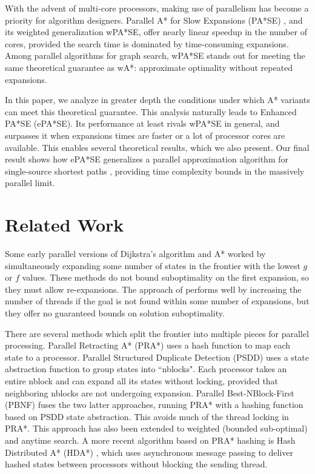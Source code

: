 \documentclass[letterpaper]{article}
\begin{document}
With the advent of multi-core processors, making use of parallelism has become a priority for algorithm designers. Parallel A* for Slow Expansions (PA*SE) \cite{phillips2014pa}, and its weighted generalization wPA*SE, offer nearly linear speedup in the number of cores, provided the search time is dominated by time-consuming expansions. Among parallel algorithms for graph search, wPA*SE stands out for meeting the same theoretical guarantee as wA*: approximate optimality without repeated expansions.

In this paper, we analyze in greater depth the conditions under which A* variants can meet this theoretical guarantee. This analysis naturally leads to Enhanced PA*SE (ePA*SE). Its performance at least rivals wPA*SE in general, and surpasses it when expansions times are faster or a lot of processor cores are available. This enables several theoretical results, which we also present. Our final result  shows how ePA*SE generalizes a parallel approximation algorithm for single-source shortest paths \cite{klein1997randomized}, providing time complexity bounds in the massively parallel limit.

\section{Related Work}

Some early parallel versions of Dijkstra’s algorithm \cite{quinn86} and A* \cite{irani86} \cite{leifker85} worked by simultaneously expanding some number of states in the frontier with the lowest $g$ or $f$ values. These methods do not bound suboptimality on the first expansion, so they must allow re-expansions.
The approach of \cite{vidal10} performs well by increasing the number of threads if the goal is not found within some number of expansions, but they offer no guaranteed bounds on solution suboptimality.

There are several methods which split the frontier into multiple pieces for parallel processing.
Parallel Retracting A* (PRA*) \cite{evett95} uses a hash function to map each state to a processor.
Parallel Structured Duplicate Detection (PSDD) \cite{zhou07}
uses a state abstraction function to group states into
``nblocks".
Each processor takes an entire nblock and can expand all its states without locking, provided
that neighboring nblocks are not undergoing expansion.
Parallel Best-NBlock-First (PBNF) \cite{burns_10} fuses the two latter
approaches, running PRA* with a hashing function
based on PSDD state abstraction.
This avoids much of the thread locking in PRA*.
This approach has also been extended to weighted (bounded
sub-optimal) and anytime search.
A more recent algorithm based on PRA* hashing is Hash Distributed A* (HDA*) \cite{kishimoto09},
which uses asynchronous message passing to deliver hashed states between processors without blocking the sending thread.
\end{document}
